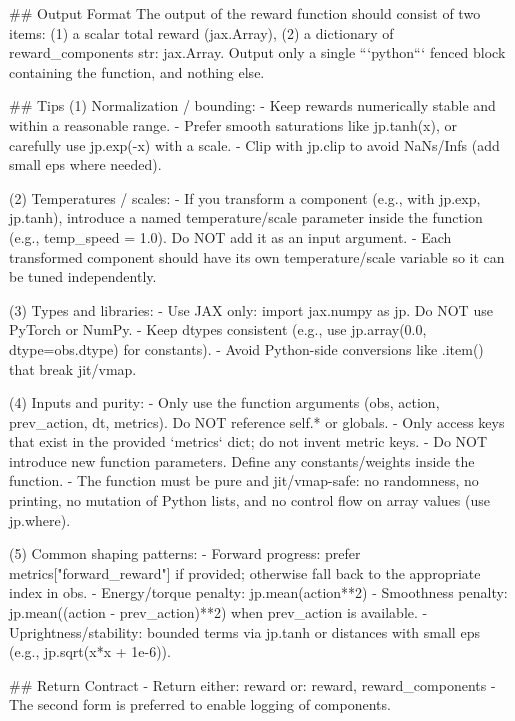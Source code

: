 \begin{promptbox}
## Output Format
The output of the reward function should consist of two items:
    (1) a scalar total reward (jax.Array),
    (2) a dictionary of reward_components {str: jax.Array}.
Output only a single ```python``` fenced block containing the function, and nothing else.

## Tips
  (1) Normalization / bounding:
      - Keep rewards numerically stable and within a reasonable range.
      - Prefer smooth saturations like jp.tanh(x), or carefully use jp.exp(-x) with a scale.
      - Clip with jp.clip to avoid NaNs/Infs (add small eps where needed).

  (2) Temperatures / scales:
      - If you transform a component (e.g., with jp.exp, jp.tanh), introduce a named temperature/scale
        parameter inside the function (e.g., temp_speed = 1.0). Do NOT add it as an input argument.
      - Each transformed component should have its own temperature/scale variable so it can be tuned independently.

  (3) Types and libraries:
      - Use JAX only: import jax.numpy as jp. Do NOT use PyTorch or NumPy.
      - Keep dtypes consistent (e.g., use jp.array(0.0, dtype=obs.dtype) for constants).
      - Avoid Python-side conversions like .item() that break jit/vmap.

  (4) Inputs and purity:
      - Only use the function arguments (obs, action, prev_action, dt, metrics). Do NOT reference self.* or globals.
      - Only access keys that exist in the provided `metrics` dict; do not invent metric keys.
      - Do NOT introduce new function parameters. Define any constants/weights inside the function.
      - The function must be pure and jit/vmap-safe: no randomness, no printing, no mutation of Python lists, and no control flow on array values (use jp.where).

  (5) Common shaping patterns:
      - Forward progress: prefer metrics["forward_reward"] if provided; otherwise fall back to the appropriate index in obs.
      - Energy/torque penalty: jp.mean(action**2)
      - Smoothness penalty: jp.mean((action - prev_action)**2) when prev_action is available.
      - Uprightness/stability: bounded terms via jp.tanh or distances with small eps (e.g., jp.sqrt(x*x + 1e-6)).

## Return Contract
  - Return either:
      reward
    or:
      reward, reward_components
  - The second form is preferred to enable logging of components.
\end{promptbox}

